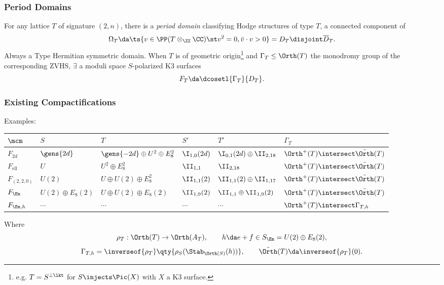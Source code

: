 \documentclass{beamer}
\begin{document}
{\begin{frame}
\end{frame}
\begin{frame}\frametitle{Period Domains}
For any lattice $T$ of signature $(2, n)$, there is a \textit{period domain} classifying Hodge structures of type $T$, a connected component of
\[
\Omega_T \da \ts{v\in \PP(T \otimes_\ZZ \CC) \st v^2 = 0, \bar{v}\cdot v > 0} = D_T \disjoint \overline{D}_T
.\]
Always a Type \IV Hermitian symmetric domain.
When $T$ is of geometric origin\footnote{e.g. $T = S^{\perp \lkt}$ for $S \injects \Pic(X)$ with $X$ a K3 surface.} and $\Gamma_T \leq \Orth(T)$ the monodromy group of the corresponding \textrm{ZVHS}, $\exists$ a moduli space $S$-polarized K3 surfaces
\[
F_T \da \dcosetl{\Gamma_T}{D_T}
.\]
\end{frame}
\begin{frame}\frametitle{Existing Compactifications}
Examples:
{\tiny \begin{center}
\begin{tabular}{l|ll|ll|l}
	$\mcm$ & $S$ & $T$ & $S'$ & $T'$ & $\Gamma_T$ \\ \hline
	$F_{2d}$
		& $\gens{2d}$
		& $\gens{-2d} \oplus U^2 \oplus E_8^2$
		& $\I_{1,0}(2d)$
		& $\I_{0,1}(2d) \oplus \II_{2,18}$ 
		& $\Orth^+(T) \intersect \tilde{\Orth}(T)$ \\

	$F_{\mathrm{ell}}$\cite{ABE22}
		& $U$
		& $U^2 \oplus E_8^2$
		& $\II_{1,1}$
		& $\II_{2,18}$ 
		& $\Orth^+(T) \intersect \tilde{\Orth}(T)$ \\

	$F_{(2,2,0)}$\cite{AE22}
		& $U(2)$
		& $U \oplus U(2) \oplus E_8^2$
		& $\II_{1,1}(2)$
		& $\II_{1,1}(2) \oplus \II_{1,17}$ 
		& $\Orth^+(T) \intersect \tilde{\Orth}(T)$ \\

	$F_{\En}$\cite{Ste95a}
		& $U(2) \oplus E_8(2)$
		& $U \oplus U(2) \oplus E_8(2)$
		& $\II_{1,9}(2)$
		& $\II_{1,1} \oplus \II_{1,9}(2)$ 
		& $\Orth^+(T) \intersect \tilde{\Orth}(T)$ \\
		
	$F_{\En, h}$\cite{Ste95a}
		& $\cdots$
		& $\cdots$
		& $\cdots$
		& $\cdots$
		& $\Orth^+(T) \intersect \Gamma_{T, h}$ \\
\end{tabular}
\end{center}
}

Where
\[
\rho_T: \Orth(T) \to \Orth(A_T), \qquad h \da e + f \in S_{\En} = U(2) \oplus E_8(2)
,\]
\[
\Gamma_{T, h} = \inverseof{\rho_T}\qty{ \rho_S(\Stab_{\Orth(S)}(h) ) },
\qquad
\tilde{\Orth}(T) \da  \inverseof{\rho_T}(0)
.\]


\end{frame}}
\end{document}
